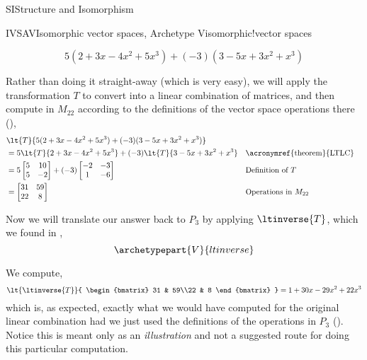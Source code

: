 \begin{subsect}{SI}{Structure and Isomorphism}
\begin{example}{IVSAV}{Isomorphic vector spaces, Archetype V}{isomorphic!vector spaces}
\begin{para}
%
\begin{equation*}
5(2+3x-4x^2+5x^3)+(-3)(3-5x+3x^2+x^3)
\end{equation*}
\end{para}
%
\begin{para}Rather than doing it straight-away (which is very easy), we will apply the transformation $T$ to convert into a linear combination of matrices, and then compute in $M_{22}$ according to the definitions of the vector space operations there (),
%
\begin{align*}
%
&\lt{T}{5(2+3x-4x^2+5x^3)+(-3)(3-5x+3x^2+x^3)}\\
&=5\lt{T}{2+3x-4x^2+5x^3}+(-3)\lt{T}{3-5x+3x^2+x^3}&&\text{\acronymref{theorem}{LTLC}}\\
&=5
\begin{bmatrix}
5 & 10\\5 & -2
\end{bmatrix}
+(-3)
\begin{bmatrix}
-2 & -3\\1 & -6
\end{bmatrix}&&\text{Definition of $T$}\\
&=
\begin{bmatrix}
31 & 59\\22 & 8
\end{bmatrix}&&\text{Operations in $M_{22}$}
%
\end{align*}
\end{para}
%
\begin{para}Now we will translate our answer back to $P_3$ by applying $\ltinverse{T}$, which we found in ,
%
\begin{equation*}
\archetypepart{V}{ltinverse}\end{equation*}
\end{para}
%
\begin{para}We compute,
%
\begin{equation*}
\lt{\ltinverse{T}}{
\begin{bmatrix}
31 & 59\\22 & 8
\end{bmatrix}
}
=1+30x-29x^2+22x^3
\end{equation*}
%
which is, as expected, exactly what we would have computed for the original linear combination had we just used the definitions of the operations in $P_3$ ().  Notice this is meant only as an {\em illustration} and not a suggested route for doing this particular computation.\end{para}

\end{example}
\end{subsect}
